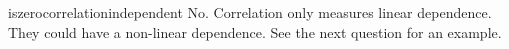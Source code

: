 \begin{answer}{iszerocorrelationindependent}
No.
Correlation only measures linear dependence.
They could have a non-linear dependence.
See the next question for an example.
\end{answer}
